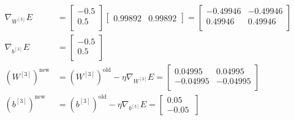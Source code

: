 \documentclass{exam}
\begin{document}
\begin{questions}
\begin{itemize}
                \begin{align*}
                    \nabla_{W^{[3]}} E &= 
                    \begin{bmatrix}
                        -0.5  \\
                        0.5  \\
                    \end{bmatrix}
                    \begin{bmatrix}
                        0.99892  & 
                        0.99892  
                    \end{bmatrix} = 
                    \begin{bmatrix}
                        -0.49946 & -0.49946  \\
                        0.49946 & 0.49946  \\
                    \end{bmatrix} \\
                    \nabla_{b^{[3]}} E &= 
                    \begin{bmatrix}
                        -0.5  \\
                        0.5  \\
                    \end{bmatrix} \\
                    (W^{[3]})^{\text{new}} &= (W^{[3]})^{\text{old}} - \eta \nabla_{W^{[3]}} E = 
                    \begin{bmatrix}
                        0.04995 & 0.04995  \\
                        -0.04995 & -0.04995  \\
                    \end{bmatrix} \\
                    (b^{[3]})^{\text{new}} &= (b^{[3]})^{\text{old}} - \eta \nabla_{b^{[3]}} E = 
                    \begin{bmatrix}
                        0.05  \\
                         -0.05  \
                    \end{bmatrix}
                \end{align*}
            \end{itemize}
    \end{questions}
\end{document}
